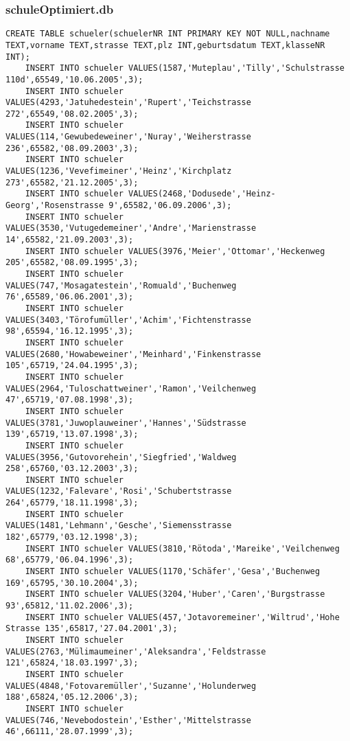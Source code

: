 \subsubsection{schuleOptimiert.db}
\begin{lstlisting}[breaklines=True, numbers=none, basicstyle=\tiny, keepspaces=false]
	CREATE TABLE schueler(schuelerNR INT PRIMARY KEY NOT NULL,nachname TEXT,vorname TEXT,strasse TEXT,plz INT,geburtsdatum TEXT,klasseNR INT);
	INSERT INTO schueler VALUES(1587,'Muteplau','Tilly','Schulstrasse 110d',65549,'10.06.2005',3);
	INSERT INTO schueler VALUES(4293,'Jatuhedestein','Rupert','Teichstrasse 272',65549,'08.02.2005',3);
	INSERT INTO schueler VALUES(114,'Gewubedeweiner','Nuray','Weiherstrasse 236',65582,'08.09.2003',3);
	INSERT INTO schueler VALUES(1236,'Vevefimeiner','Heinz','Kirchplatz 273',65582,'21.12.2005',3);
	INSERT INTO schueler VALUES(2468,'Dodusede','Heinz-Georg','Rosenstrasse 9',65582,'06.09.2006',3);
	INSERT INTO schueler VALUES(3530,'Vutugedemeiner','Andre','Marienstrasse 14',65582,'21.09.2003',3);
	INSERT INTO schueler VALUES(3976,'Meier','Ottomar','Heckenweg 205',65582,'08.09.1995',3);
	INSERT INTO schueler VALUES(747,'Mosagatestein','Romuald','Buchenweg 76',65589,'06.06.2001',3);
	INSERT INTO schueler VALUES(3403,'Törofumüller','Achim','Fichtenstrasse 98',65594,'16.12.1995',3);
	INSERT INTO schueler VALUES(2680,'Howabeweiner','Meinhard','Finkenstrasse 105',65719,'24.04.1995',3);
	INSERT INTO schueler VALUES(2964,'Tuloschattweiner','Ramon','Veilchenweg 47',65719,'07.08.1998',3);
	INSERT INTO schueler VALUES(3781,'Juwoplauweiner','Hannes','Südstrasse 139',65719,'13.07.1998',3);
	INSERT INTO schueler VALUES(3956,'Gutovorehein','Siegfried','Waldweg 258',65760,'03.12.2003',3);
	INSERT INTO schueler VALUES(1232,'Falevare','Rosi','Schubertstrasse 264',65779,'18.11.1998',3);
	INSERT INTO schueler VALUES(1481,'Lehmann','Gesche','Siemensstrasse 182',65779,'03.12.1998',3);
	INSERT INTO schueler VALUES(3810,'Rötoda','Mareike','Veilchenweg 68',65779,'06.04.1996',3);
	INSERT INTO schueler VALUES(1170,'Schäfer','Gesa','Buchenweg 169',65795,'30.10.2004',3);
	INSERT INTO schueler VALUES(3204,'Huber','Caren','Burgstrasse 93',65812,'11.02.2006',3);
	INSERT INTO schueler VALUES(457,'Jotavoremeiner','Wiltrud','Hohe Strasse 135',65817,'27.04.2001',3);
	INSERT INTO schueler VALUES(2763,'Mülimaumeiner','Aleksandra','Feldstrasse 121',65824,'18.03.1997',3);
	INSERT INTO schueler VALUES(4848,'Fotovaremüller','Suzanne','Holunderweg 188',65824,'05.12.2006',3);
	INSERT INTO schueler VALUES(746,'Nevebodostein','Esther','Mittelstrasse 46',66111,'28.07.1999',3);

\end{lstlisting}
